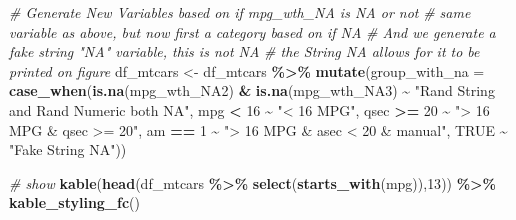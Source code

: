 \documentclass[
]{book}
\newenvironment{Shaded}{\begin{snugshade}}{\end{snugshade}}
\newcommand{\CommentTok}[1]{\textcolor[rgb]{0.56,0.35,0.01}{\textit{#1}}}
\newcommand{\DataTypeTok}[1]{\textcolor[rgb]{0.13,0.29,0.53}{#1}}
\newcommand{\DecValTok}[1]{\textcolor[rgb]{0.00,0.00,0.81}{#1}}
\newcommand{\KeywordTok}[1]{\textcolor[rgb]{0.13,0.29,0.53}{\textbf{#1}}}
\newcommand{\NormalTok}[1]{#1}
\newcommand{\OperatorTok}[1]{\textcolor[rgb]{0.81,0.36,0.00}{\textbf{#1}}}
\newcommand{\OtherTok}[1]{\textcolor[rgb]{0.56,0.35,0.01}{#1}}
\newcommand{\StringTok}[1]{\textcolor[rgb]{0.31,0.60,0.02}{#1}}
\begin{document}
\begin{Shaded}
\begin{Highlighting}[]
\CommentTok{\# Generate New Variables based on if mpg\_wth\_NA is NA or not}
\CommentTok{\# same variable as above, but now first a category based on if NA}
\CommentTok{\# And we generate a fake string "NA" variable, this is not NA}
\CommentTok{\# the String NA allows for it to be printed on figure}
\NormalTok{df\_mtcars \textless{}{-}}\StringTok{ }\NormalTok{df\_mtcars }\OperatorTok{\%\textgreater{}\%}
\StringTok{  }\KeywordTok{mutate}\NormalTok{(}\DataTypeTok{group\_with\_na =} 
           \KeywordTok{case\_when}\NormalTok{(}\KeywordTok{is.na}\NormalTok{(mpg\_wth\_NA2) }\OperatorTok{\&}\StringTok{ }\KeywordTok{is.na}\NormalTok{(mpg\_wth\_NA3) }\OperatorTok{\textasciitilde{}}\StringTok{ }
\StringTok{                       "Rand String and Rand Numeric both NA"}\NormalTok{, }
\NormalTok{                     mpg }\OperatorTok{\textless{}}\StringTok{ }\DecValTok{16} \OperatorTok{\textasciitilde{}}\StringTok{ "\textless{} 16 MPG"}\NormalTok{,}
\NormalTok{                     qsec }\OperatorTok{\textgreater{}=}\StringTok{ }\DecValTok{20} \OperatorTok{\textasciitilde{}}\StringTok{ "\textgreater{} 16 MPG \& qsec \textgreater{}= 20"}\NormalTok{,}
\NormalTok{                     am }\OperatorTok{==}\StringTok{ }\DecValTok{1} \OperatorTok{\textasciitilde{}}\StringTok{ "\textgreater{} 16 MPG \& asec \textless{} 20 \& manual"}\NormalTok{,}
                     \OtherTok{TRUE} \OperatorTok{\textasciitilde{}}\StringTok{ "Fake String NA"}\NormalTok{))}

\CommentTok{\# show}
\KeywordTok{kable}\NormalTok{(}\KeywordTok{head}\NormalTok{(df\_mtcars }\OperatorTok{\%\textgreater{}\%}\StringTok{ }\KeywordTok{select}\NormalTok{(}\KeywordTok{starts\_with}\NormalTok{(}\StringTok{\textquotesingle{}mpg\textquotesingle{}}\NormalTok{)),}\DecValTok{13}\NormalTok{)) }\OperatorTok{\%\textgreater{}\%}
\StringTok{  }\KeywordTok{kable\_styling\_fc}\NormalTok{()}
\end{Highlighting}
\end{Shaded}
\end{document}
